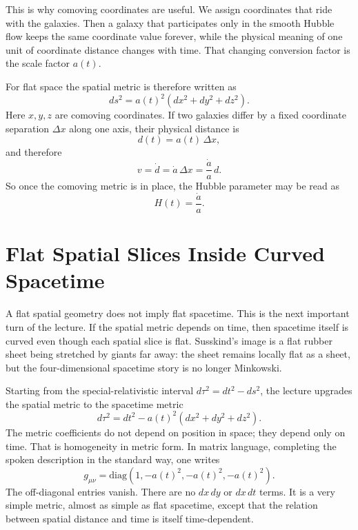 This is why comoving coordinates are useful. We assign coordinates that ride with the galaxies. Then a galaxy that participates only in the smooth Hubble flow keeps the same coordinate value forever, while the physical meaning of one unit of coordinate distance changes with time. That changing conversion factor is the scale factor \(a(t)\).

For flat space the spatial metric is therefore written as
\begin{equation}
ds^2 = a(t)^2\left(dx^2+dy^2+dz^2\right).
\end{equation}
Here \(x,y,z\) are comoving coordinates. If two galaxies differ by a fixed coordinate separation \(\Delta x\) along one axis, their physical distance is
\begin{equation}
d(t)=a(t)\,\Delta x,
\end{equation}
and therefore
\begin{equation}
v=\dot d=\dot a\,\Delta x=\frac{\dot a}{a}\,d.
\end{equation}
So once the comoving metric is in place, the Hubble parameter may be read as
\begin{equation}
H(t)=\frac{\dot a}{a}.
\end{equation}

\section{Flat Spatial Slices Inside Curved Spacetime}

A flat spatial geometry does not imply flat spacetime. This is the next important turn of the lecture. If the spatial metric depends on time, then spacetime itself is curved even though each spatial slice is flat. Susskind's image is a flat rubber sheet being stretched by giants far away: the sheet remains locally flat as a sheet, but the four-dimensional spacetime story is no longer Minkowski.

Starting from the special-relativistic interval \(d\tau^2 = dt^2-ds^2\), the lecture upgrades the spatial metric to the spacetime metric
\begin{equation}
d\tau^2 = dt^2 - a(t)^2\left(dx^2+dy^2+dz^2\right).
\end{equation}
The metric coefficients do not depend on position in space; they depend only on time. That is homogeneity in metric form. In matrix language, completing the spoken description in the standard way, one writes
\begin{equation}
g_{\mu\nu}=\mathrm{diag}\!\left(1,-a(t)^2,-a(t)^2,-a(t)^2\right).
\end{equation}
The off-diagonal entries vanish. There are no \(dx\,dy\) or \(dx\,dt\) terms. It is a very simple metric, almost as simple as flat spacetime, except that the relation between spatial distance and time is itself time-dependent.

